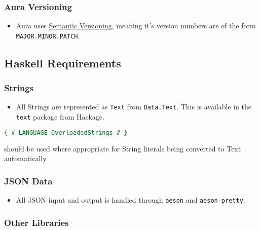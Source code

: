 \documentclass{article}
\begin{document}
\subsubsection{Aura Versioning}\label{aura-versioning}

\begin{itemize}
\itemsep1pt\parskip0pt
\item
  Aura uses \href{http://semver.org/}{Semantic Versioning}, meaning it's
  version numbers are of the form \texttt{MAJOR.MINOR.PATCH}.
\end{itemize}

\subsection{Haskell Requirements}\label{haskell-requirements}

\subsubsection{Strings}\label{strings}

\begin{itemize}
\itemsep1pt\parskip0pt
\item
  All Strings are represented as \texttt{Text} from \texttt{Data.Text}.
  This is available in the \texttt{text} package from Hackage.
\end{itemize}

\begin{shaded}
\begin{lstlisting}[language=haskell]
{-# LANGUAGE OverloadedStrings #-}
\end{lstlisting}
\end{shaded}

should be used where appropriate for String literals being converted to
Text automatically.

\subsubsection{JSON Data}\label{json-data}

\begin{itemize}
\itemsep1pt\parskip0pt
\item
  All JSON input and output is handled through \texttt{aeson} and
  \texttt{aeson-pretty}.
\end{itemize}

\subsubsection{Other Libraries}\label{other-libraries}
\end{document}
